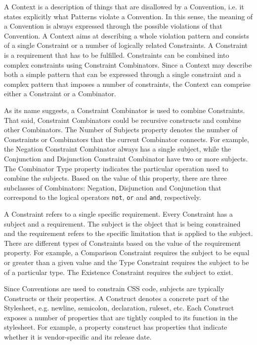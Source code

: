 A Context is a description of things that are disallowed by a Convention, i.e. it states explicitly
what Patterns violate a Convention. In this sense, the meaning of a Convention is always expressed
through the possible violations of that Convention. A Context aims at describing a whole violation
pattern and consists of a single Constraint or a number of logically related Constraints. A
Constraint is a requirement that has to be fulfilled. Constraints can be combined
into complex constraints using Constraint Combinators. Since a Context may describe both a simple
pattern that can be expressed through a single constraint and a complex pattern that imposes a
number of constraints, the Context can comprise either a Constraint or a Combinator. 

As its name suggests, a Constraint Combinator is used to combine Constraints. That said, Constraint
Combinators could be recursive constructs and combine other Combinators. The Number of Subjects
property denotes the number of Constraints or Combinators that the current Combinator connects. For
example, the Negation Constraint Combinator always has a single subject, while the Conjunction and
Disjunction Constraint Combinator have two or more subjects. The Combinator Type property indicates
the particular operation used to combine the subjects. Based on the value of this property, there
are three subclasses of Combinators: Negation, Disjunction and Conjunction that correspond to the
logical operators \texttt{not}, \texttt{or} and \texttt{and}, respectively.

A Constraint refers to a single specific requirement. Every Constraint has a subject and a
requirement. The subject is the object that is being constrained and the requirement refers to the
specific limitation that is applied to the subject. There are different types of Constraints based
on the value of the requirement property. For example, a Comparison Constraint requires the subject
to be equal or greater than a given value and the Type Constraint requires the subject to be of a
particular type. The Existence Constraint requires the subject to exist.

Since Conventions are used to constrain CSS code, subjects are typically Constructs or their
properties. A Construct denotes a concrete part of the Stylesheet, e.g. newline, semicolon,
declaration, ruleset, etc. Each Construct exposes a number of properties that are tightly coupled to
its function in the stylesheet. For example, a property construct has properties
that indicate whether it is vendor-specific and its release date.

